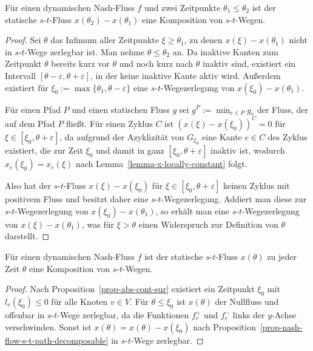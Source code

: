 \begin{proposition}\label{prop-nash-flow-s-t-path-decomposable}
	Für einen dynamischen Nash-Fluss $f$ und zwei Zeitpunkte $\theta_1 \leq \theta_2$ ist der statische $s$-$t$-Fluss $x(\theta_2) - x(\theta_1)$ eine Komposition von $s$-$t$-Wegen.
\end{proposition}
\begin{proof}
	Sei $\theta$ das Infimum aller Zeitpunkte $\xi\geq\theta_1$, zu denen $x(\xi) - x(\theta_1)$ nicht in $s$-$t$-Wege zerlegbar ist.
	Man nehme $\theta \leq \theta_2$ an.
	Da inaktive Kanten zum Zeitpunkt $\theta$ bereits kurz vor $\theta$ und noch kurz nach $\theta$ inaktiv sind, existiert ein Intervall $[\theta - \varepsilon, \theta + \varepsilon]$, in der keine inaktive Kante aktiv wird.
	Außerdem existiert für $\xi_0 := \max \{ \theta_1, \theta - \varepsilon \}$ eine $s$-$t$-Wegezerlegung von $x(\xi_0) - x(\theta_1)$.
	
	Für einen Pfad $P$ und einen statischen Fluss $g$ sei $g^P := \min_{e\in P} g_e$ der Fluss, der auf dem Pfad $P$ fließt.
	Für einen Zyklus $C$ ist $(x(\xi) - x(\xi_0))^C = 0$ für $\xi\in [\xi_0, \theta+\varepsilon]$, da aufgrund der Azyklizität von $G_{\xi_0}$ eine Kante $e\in C$ des Zyklus existiert, die zur Zeit $\xi_0$ und damit in ganz $[\xi_0, \theta+\varepsilon]$ inaktiv ist, wodurch $x_e(\xi_0) = x_e(\xi)$ nach Lemma~\ref{lemma-x-locally-constant} folgt.
	
	Also hat der $s$-$t$-Fluss $x(\xi) - x(\xi_0)$ für $\xi\in [\xi_0, \theta + \varepsilon]$ keinen Zyklus mit positivem Fluss und besitzt daher eine $s$-$t$-Wegezerlegung.
	Addiert man diese zur $s$-$t$-Wegezerlegung von $x(\xi_0) - x(\theta_1)$, so erhält man eine $s$-$t$-Wegezerlegung von $x(\xi) - x(\theta_1)$, was für $\xi > \theta$ einen Widerspruch zur Definition von $\theta$ darstellt.
\end{proof}

\begin{corollary}
	Für einen dynamischen Nash-Fluss $f$ ist der statische $s$-$t$-Fluss $x(\theta)$ zu jeder Zeit $\theta$ eine Komposition von $s$-$t$-Wegen.
\end{corollary}
\begin{proof}
	Nach Proposition~\ref{prop-abs-cont-sur} existiert ein Zeitpunkt $\xi_0$ mit $l_v(\xi_0) \leq 0$ für alle Knoten $v\in V$.
	Für $\theta \leq \xi_0$ ist $x(\theta)$ der Nullfluss und offenbar in $s$-$t$-Wege zerlegbar, da die Funktionen $f_e^+$ und $f_e^-$ links der $y$-Achse verschwinden.
	Sonst ist $x(\theta)=  x(\theta) - x(\xi_0)$ nach Proposition~\ref{prop-nash-flow-s-t-path-decomposable} in $s$-$t$-Wege zerlegbar.
\end{proof}